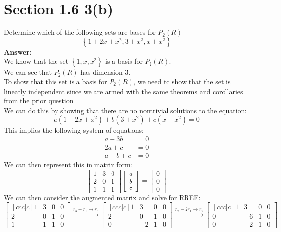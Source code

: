 \documentclass{article}
\begin{document}
\section*{Section 1.6 3(b)}
Determine which of the following sets are bases for $P_2(R)$
$$ \left\{ 1+2x+x^2,3+x^2, x+x^2 \right\}$$
\textbf{Answer:}\\
We know that the set $\left\{ 1, x, x^2 \right\}$ is a basis for $P_2(R)$.\\
We can see that $P_2(R)$ has dimension 3.\\
To show that this set is a basis for $P_2(R)$, we need to show that the set is linearly independent since we are armed with the same theorems and corollaries from the prior question\\
We can do this by showing that there are no nontrivial solutions to the equation:
$$ a(1+2x+x^2) + b(3+x^2) + c(x+x^2) = 0$$
This implies the following system of equations:
\begin{align*}
    a + 3b &= 0\\
    2a + c &= 0\\
    a + b + c &= 0
\end{align*}
We can then represent this in matrix form:
$$ \begin{bmatrix}
    1 & 3 & 0 \\
    2 & 0 & 1 \\
    1 & 1 & 1
\end{bmatrix} \begin{bmatrix}
    a \\ b \\ c
\end{bmatrix} = \begin{bmatrix}
    0 \\ 0 \\ 0
\end{bmatrix} $$
We can then consider the augmented matrix and solve for RREF:
$$ \begin{bmatrix}[ccc|c]
    1 & 3 & 0 & 0\\
    2 & 0 & 1 & 0\\
    1 & 1 & 1 & 0
\end{bmatrix} \xrightarrow{r_3 - r_1 \rightarrow r_3} \begin{bmatrix}[ccc|c]
    1 & 3 & 0 & 0\\
    2 & 0 & 1 & 0\\
    0 & -2 & 1 & 0
\end{bmatrix} \xrightarrow{r_2 - 2r_1 \rightarrow r_2} \begin{bmatrix}[ccc|c]
    1 & 3 & 0 & 0\\
    0 & -6 & 1 & 0\\
    0 & -2 & 1 & 0
\end{bmatrix}$$
\end{document}
